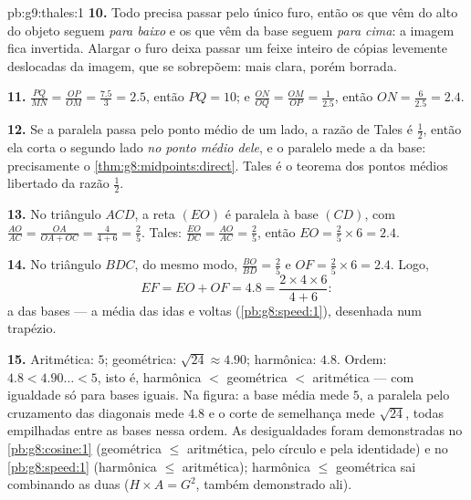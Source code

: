 \begin{solution}{pb:g9:thales:1}
\textbf{10.} Todo  precisa passar pelo único furo, então os 
que vêm do alto do objeto seguem \emph{para baixo} e os que vêm da base
seguem \emph{para cima}: a imagem fica invertida. Alargar o furo deixa
passar um feixe inteiro de cópias levemente deslocadas da imagem, que
se sobrepõem: mais clara, porém borrada.

\textbf{11.} $\frac{PQ}{MN} = \frac{OP}{OM} = \frac{7.5}{3} = 2.5$,
então $PQ = 10$; e $\frac{ON}{OQ} = \frac{OM}{OP} = \frac{1}{2.5}$,
então $ON = \frac{6}{2.5} = 2.4$.

\textbf{12.} Se a paralela passa pelo ponto médio de um lado, a razão
de Tales é $\frac12$, então ela corta o segundo lado \emph{no ponto
médio dele}, e o  paralelo mede a  da base: precisamente
o \cref{thm:g8:midpoints:direct}. Tales é o teorema dos pontos médios
libertado da razão $\frac12$.

\textbf{13.} No triângulo $ACD$, a reta $(EO)$ é paralela à base
$(CD)$, com $\frac{AO}{AC} = \frac{OA}{OA + OC} = \frac{4}{4 + 6} =
\frac25$. Tales: $\frac{EO}{DC} = \frac{AO}{AC} = \frac25$, então
$EO = \frac25 \times 6 = 2.4$.

\textbf{14.} No triângulo $BDC$, do mesmo modo,
$\frac{BO}{BD} = \frac25$ e $OF = \frac25 \times 6 = 2.4$. Logo,
\[
EF = EO + OF = 4.8
= \frac{2 \times 4 \times 6}{4 + 6} :
\]
a  das bases --- a média das idas e voltas
(\cref{pb:g8:speed:1}), desenhada num trapézio.

\textbf{15.} Aritmética: $5$; geométrica: $\sqrt{24} \approx 4.90$;
harmônica: $4.8$. Ordem: $4.8 < 4.90\ldots < 5$, isto é, harmônica $<$
geométrica $<$ aritmética --- com igualdade só para bases iguais. Na
figura: a base média mede $5$, a paralela pelo cruzamento das diagonais
mede $4.8$ e o corte de semelhança mede $\sqrt{24}$, todas empilhadas
entre as bases nessa ordem. As desigualdades foram demonstradas no
\cref{pb:g8:cosine:1} (geométrica $\leq$ aritmética, pelo círculo e
pela identidade) e no \cref{pb:g8:speed:1} (harmônica $\leq$
aritmética); harmônica $\leq$ geométrica sai combinando as duas
($H \times A = G^2$, também demonstrado ali).
\end{solution}

